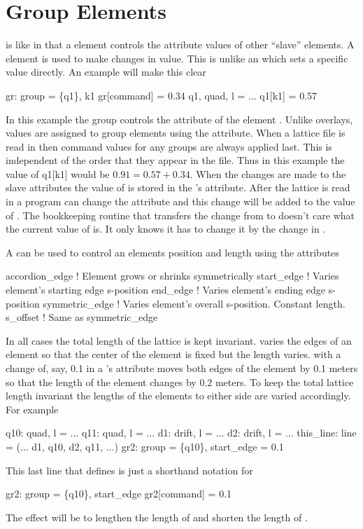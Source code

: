 \section{Group Elements}
\label{s:group}
 
 is like  in that a  element controls
the attribute values of other ``slave'' elements.  A 
element is used to make changes in value. This is unlike an
 which sets a specific value directly. An example will
make this clear
\begin{example}
  gr: group = \{q1\}, k1 
  gr[command] = 0.34 
  q1, quad, l = ...
  q1[k1] = 0.57
\end{example}
In this example the group  controls the  attribute of
the element . Unlike overlays, values are assigned to group
elements using the  attribute.  When a lattice file is
read in then command values for any groups are always applied
last. This is independent of the order that they appear in the file.
Thus in this example the value of q1[k1] would be $0.91 = 0.57 + 0.34$.
When the changes are made to the slave attributes the value of
 is stored in the 's  attribute.
After the lattice is read in a program can change the 
attribute and this change will be added to the value of
. The bookkeeping routine that transfers the change from
 to  doesn't care what the current value of
 is. It only knows it has to change it by the change in
.

A  can be used to control an elements position and length
using the attributes
\begin{example}
  accordion_edge  ! Element grows or shrinks symmetrically
  start_edge      ! Varies element's starting edge s-position
  end_edge        ! Varies element's ending edge s-position
  symmetric_edge  ! Varies element's overall s-position. Constant length.
  s_offset        ! Same as symmetric_edge
\end{example}
In all cases the total length of the lattice is kept invariant.
 varies the edges of an element so that the center
of the element is fixed but the length varies. with
 a change of, say, 0.1 in a 's
 attribute moves both edges of the element by 0.1 meters
so that the length of the element changes by 0.2 meters. To keep the
total lattice length invariant the lengths of the elements to either
side are varied accordingly.
For example
\begin{example}
  q10: quad, l = ...
  q11: quad, l = ...
  d1: drift, l = ...
  d2: drift, l = ...
  this_line: line = (... d1, q10, d2, q11, ...)
  gr2: group = \{q10\}, start_edge = 0.1
\end{example}
This last line that defines  is just a shorthand notation for
\begin{example}
  gr2: group = \{q10\}, start_edge 
  gr2[command] = 0.1
\end{example}
The effect will be to lengthen the length of  and shorten the
length of .

